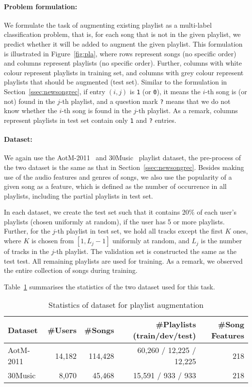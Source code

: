 \paragraph{Problem formulation:}
We formulate the task of augmenting existing playlist as a multi-label classification problem,
that is, for each song that is not in the given playlist, 
we predict whether it will be added to augment the given playlist.
This formulation is illustrated in Figure~\ref{fig:pla},
where rows represent songs (no specific order) and columns represent playlists (no specific order).
Further, columns with white colour represent playlists in training set, 
and columns with grey colour represent playlists that should be augmented (\ie test set).
Similar to the formulation in Section~\ref{ssec:newsongrec}, if entry $(i, j)$ is \texttt{1} (or \texttt{0}), 
it means the $i$-th song is (or not) found in the $j$-th playlist, 
and a question mark \texttt{?} means that we do not know whether the $i$-th song is found in the $j$-th playlist.
As a remark, columns represent playlists in test set contain only \texttt{1} and \texttt{?} entries.



\paragraph{Dataset:}
We again use the AotM-2011~\cite{mcfee2012hypergraph} and 30Music~\cite{30music2015} playlist dataset,
the pre-process of the two dataset is the same as that in Section~\ref{ssec:newsongrec}.
Besides making use of the audio features and genres of songs,
we also use the popularity of a given song as a feature, which is defined as the number of occurrence in all playlists,
including the partial playlists in test set.

In each dataset, we create the test set such that it contains 20\% of each user's playlists (chosen uniformly at random),
if the user has 5 or more playlists. Further, for the $j$-th playlist in test set, we hold all tracks except the first $K$ ones,
where $K$ is chosen from $[1, L_j-1]$ uniformly at random, and $L_j$ is the number of tracks in the $j$-th playlist.
The validation set is constructed the same as the test test.
All remaining playlists are used for training.
As a remark, we observed the entire collection of songs during training.

Table~\ref{tab:stats_pla} summarises the statistics of the two dataset used for this task.

\begin{table}[!h]
\centering
\caption{Statistics of dataset for playlist augmentation}
\label{tab:stats_pla}
\small
\begin{tabular}{l|rrrr}
\toprule
Dataset & \#Users & \#Songs & \#Playlists (train/dev/test)  & \#Song Features \\
\midrule
AotM-2011 & 14,182 & 114,428 & 60,260 / 12,225 / 12,225 & 218 \\
30Music   & 8,070  & 45,468  & 15,591 / 933 / 933       & 218 \\
\bottomrule
\end{tabular}
\end{table}


